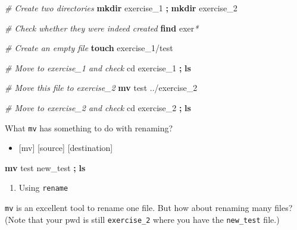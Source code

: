 \documentclass[
]{book}
\newenvironment{Shaded}{\begin{snugshade}}{\end{snugshade}}
\newcommand{\BuiltInTok}[1]{#1}
\newcommand{\CommentTok}[1]{\textcolor[rgb]{0.56,0.35,0.01}{\textit{#1}}}
\newcommand{\ControlFlowTok}[1]{\textcolor[rgb]{0.13,0.29,0.53}{\textbf{#1}}}
\newcommand{\DataTypeTok}[1]{\textcolor[rgb]{0.13,0.29,0.53}{#1}}
\newcommand{\DecValTok}[1]{\textcolor[rgb]{0.00,0.00,0.81}{#1}}
\newcommand{\FunctionTok}[1]{\textcolor[rgb]{0.13,0.29,0.53}{\textbf{#1}}}
\newcommand{\KeywordTok}[1]{\textcolor[rgb]{0.13,0.29,0.53}{\textbf{#1}}}
\newcommand{\NormalTok}[1]{#1}
\newcommand{\PreprocessorTok}[1]{\textcolor[rgb]{0.56,0.35,0.01}{\textit{#1}}}
\newcommand{\StringTok}[1]{\textcolor[rgb]{0.31,0.60,0.02}{#1}}
\newcommand{\VariableTok}[1]{\textcolor[rgb]{0.00,0.00,0.00}{#1}}
\providecommand{\tightlist}{%
  \setlength{\itemsep}{0pt}\setlength{\parskip}{0pt}}
\begin{document}
\begin{Shaded}
\begin{Highlighting}[]
\CommentTok{\# Create two directories}
\FunctionTok{mkdir}\NormalTok{ exercise\_1 }\KeywordTok{;} \FunctionTok{mkdir}\NormalTok{ exercise\_2}

\CommentTok{\# Check whether they were indeed created}
\FunctionTok{find}\NormalTok{ exer}\PreprocessorTok{*}

\CommentTok{\# Create an empty file}
\FunctionTok{touch}\NormalTok{ exercise\_1/test}

\CommentTok{\# Move to exercise\_1 and check}
\BuiltInTok{cd}\NormalTok{ exercise\_1 }\KeywordTok{;} \FunctionTok{ls}

\CommentTok{\# Move this file to exercise\_2}
\FunctionTok{mv}\NormalTok{ test ../exercise\_2}

\CommentTok{\# Move to exercise\_2 and check}
\BuiltInTok{cd}\NormalTok{ exercise\_2 }\KeywordTok{;} \FunctionTok{ls}
\end{Highlighting}
\end{Shaded}

What \texttt{mv} has something to do with renaming?

\begin{itemize}
\tightlist
\item
  {[}mv{]} {[}source{]} {[}destination{]}
\end{itemize}

\begin{Shaded}
\begin{Highlighting}[]
\FunctionTok{mv}\NormalTok{ test new\_test }\KeywordTok{;} \FunctionTok{ls}
\end{Highlighting}
\end{Shaded}

\begin{enumerate}
\def\labelenumi{\arabic{enumi}.}
\setcounter{enumi}{1}
\tightlist
\item
  Using \texttt{rename}
\end{enumerate}

\texttt{mv} is an excellent tool to rename one file. But how about renaming many files? (Note that your pwd is still \texttt{exercise\_2} where you have the \texttt{new\_test} file.)

\begin{Shaded}
\end{Shaded}
\end{document}
